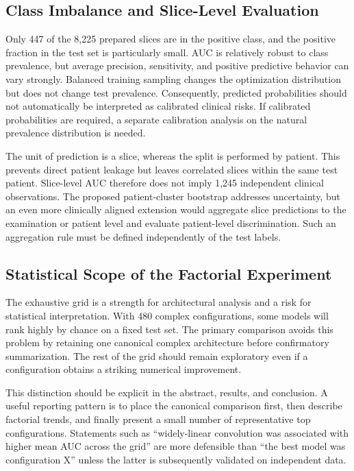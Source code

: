 \documentclass[journal]{IEEEtran}
\begin{document}
\subsection{Class Imbalance and Slice-Level Evaluation}
Only 447 of the 8,225 prepared slices are in the positive class, and the positive fraction in the test set is particularly small. AUC is relatively robust to class prevalence, but average precision, sensitivity, and positive predictive behavior can vary strongly. Balanced training sampling changes the optimization distribution but does not change test prevalence. Consequently, predicted probabilities should not automatically be interpreted as calibrated clinical risks. If calibrated probabilities are required, a separate calibration analysis on the natural prevalence distribution is needed.

The unit of prediction is a slice, whereas the split is performed by patient. This prevents direct patient leakage but leaves correlated slices within the same test patient. Slice-level AUC therefore does not imply 1,245 independent clinical observations. The proposed patient-cluster bootstrap addresses uncertainty, but an even more clinically aligned extension would aggregate slice predictions to the examination or patient level and evaluate patient-level discrimination. Such an aggregation rule must be defined independently of the test labels.

\subsection{Statistical Scope of the Factorial Experiment}
The exhaustive grid is a strength for architectural analysis and a risk for statistical interpretation. With 480 complex configurations, some models will rank highly by chance on a fixed test set. The primary comparison avoids this problem by retaining one canonical complex architecture before confirmatory summarization. The rest of the grid should remain exploratory even if a configuration obtains a striking numerical improvement.

This distinction should be explicit in the abstract, results, and conclusion. A useful reporting pattern is to place the canonical comparison first, then describe factorial trends, and finally present a small number of representative top configurations. Statements such as ``widely-linear convolution was associated with higher mean AUC across the grid'' are more defensible than ``the best model was configuration X'' unless the latter is subsequently validated on independent data.
\end{document}
